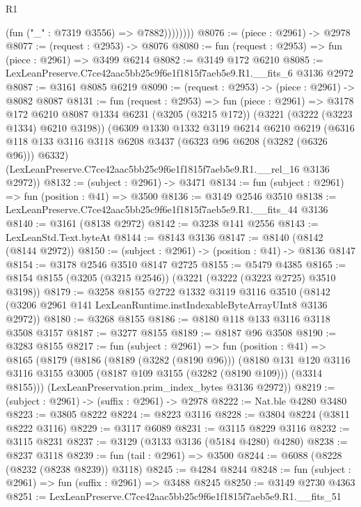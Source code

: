 \begin{lexlean}{R1}
\begin{coremodule}
                  (fun ("_" : @7319 @3556) => @7882))))))))
@8076 := (piece : @2961) -> @2978
@8077 := (request : @2953) -> @8076
@8080 := fun (request : @2953) => fun (piece : @2961) => @3499 @6214
@8082 := @3149 @172 @6210
@8085 := LexLeanPreserve.C7ce42aac5bb25c9f6e1f1815f7aeb5e9.R1.__fits_6 @3136 @2972
@8087 := @3161 @8085 @6219
@8090 := (request : @2953) -> (piece : @2961) -> @8082 @8087
@8131 := fun (request : @2953) =>
  fun (piece : @2961) =>
  @3178
    @172
    @6210
    @8087
    @1334
    @6231
    (@3205 (@3215 @172))
    (@3221 (@3222 (@3223 @1334) @6210 @3198))
    (@6309
      @1330
      @1332
      @3119
      @6214
      @6210
      @6219
      (@6316 @118 @133 @3116 @3118 @6208 @3437 (@6323 @96 @6208 (@3282 (@6326 @96))) @6332)
      (LexLeanPreserve.C7ce42aac5bb25c9f6e1f1815f7aeb5e9.R1.__rel_16 @3136 @2972))
@8132 := (subject : @2961) -> @3471
@8134 := fun (subject : @2961) => fun (position : @41) => @3500
@8136 := @3149 @2546 @3510
@8138 := LexLeanPreserve.C7ce42aac5bb25c9f6e1f1815f7aeb5e9.R1.__fits_44 @3136
@8140 := @3161 (@8138 @2972)
@8142 := @3238 @141 @2556
@8143 := LexLeanStd.Text.byteAt
@8144 := @8143 @3136
@8147 := @8140 (@8142 (@8144 @2972))
@8150 := (subject : @2961) -> (position : @41) -> @8136 @8147
@8154 := @3178 @2546 @3510 @8147 @2725
@8155 := @5479 @4385
@8165 := @8154 @8155 (@3205 (@3215 @2546)) (@3221 (@3222 (@3223 @2725) @3510 @3198))
@8179 := @3258
    @8155
    @2722
    @1332
    @3119
    @3116
    @3510
    (@8142 (@3206 @2961 @141 LexLeanRuntime.instIndexableByteArrayUInt8 @3136 @2972))
@8180 := @3268 @8155
@8186 := @8180 @118 @133 @3116 @3118 @3508 @3157
@8187 := @3277 @8155
@8189 := @8187 @96 @3508
@8190 := @3283 @8155
@8217 := fun (subject : @2961) =>
  fun (position : @41) =>
  @8165
    (@8179
      (@8186
        (@8189 (@3282 (@8190 @96)))
        (@8180
          @131
          @120
          @3116
          @3116
          @3155
          @3005
          (@8187 @109 @3155 (@3282 (@8190 @109)))
          (@3314 @8155)))
      (LexLeanPreservation.prim_index_bytes @3136 @2972))
@8219 := (subject : @2961) -> (suffix : @2961) -> @2978
@8222 := Nat.ble @4280 @3480
@8223 := @3805 @8222
@8224 := @8223 @3116
@8228 := @3804 @8224 (@3811 @8222 @3116)
@8229 := @3117 @6089
@8231 := @3115 @8229 @3116
@8232 := @3115 @8231
@8237 := @3129 (@3133 @3136 (@5184 @4280) @4280)
@8238 := @8237 @3118
@8239 := fun (tail : @2961) => @3500
@8244 := @6088 (@8228 (@8232 (@8238 @8239)) @3118)
@8245 := @4284 @8244
@8248 := fun (subject : @2961) => fun (suffix : @2961) => @3488 @8245
@8250 := @3149 @2730 @4363
@8251 := LexLeanPreserve.C7ce42aac5bb25c9f6e1f1815f7aeb5e9.R1.__fits_51

\end{coremodule}
\end{lexlean}

